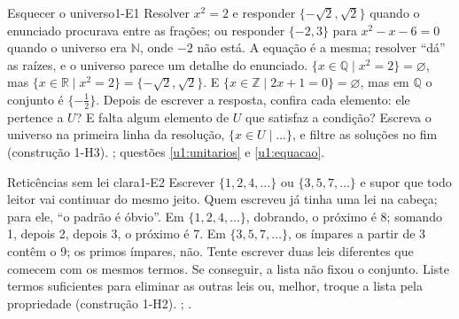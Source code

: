 \ErrosComuns

\begin{erro}{Esquecer o universo}{1-E1}
 Resolver $x^2=2$ e responder $\{-\sqrt2,\sqrt2\}$ quando o enunciado procurava entre as frações; ou responder $\{-2,3\}$ para $x^2-x-6=0$ quando o universo era $\mathbb{N}$, onde $-2$ não está.
 A equação é a mesma; resolver \enquote{dá} as raízes, e o universo parece um detalhe do enunciado.
 $\{x\in\mathbb{Q}\mid x^2=2\}=\varnothing$, mas $\{x\in\mathbb{R}\mid x^2=2\}=\{-\sqrt2,\sqrt2\}$. E $\{x\in\mathbb{Z}\mid 2x+1=0\}=\varnothing$, mas em $\mathbb{Q}$ o conjunto é $\{-\tfrac12\}$.
 Depois de escrever a resposta, confira cada elemento: ele pertence a $U$? E falta algum elemento de $U$ que satisfaz a condição?
 Escreva o universo na primeira linha da resolução, $\{x\in U\mid\ldots\}$, e filtre as soluções no fim (construção 1-H3).
 ; questões \ref{u1:unitarios} e \ref{u1:equacao}.
\end{erro}

\begin{erro}{Reticências sem lei clara}{1-E2}
 Escrever $\{1,2,4,\ldots\}$ ou $\{3,5,7,\ldots\}$ e supor que todo leitor vai continuar do mesmo jeito.
 Quem escreveu já tinha uma lei na cabeça; para ele, \enquote{o padrão é óbvio}.
 Em $\{1,2,4,\ldots\}$, dobrando, o próximo é 8; somando 1, depois 2, depois 3, o próximo é 7. Em $\{3,5,7,\ldots\}$, os ímpares a partir de 3 contêm o 9; os primos ímpares, não.
 Tente escrever duas leis diferentes que comecem com os mesmos termos. Se conseguir, a lista não fixou o conjunto.
 Liste termos suficientes para eliminar as outras leis ou, melhor, troque a lista pela propriedade (construção 1-H2).
 ; .
\end{erro}

